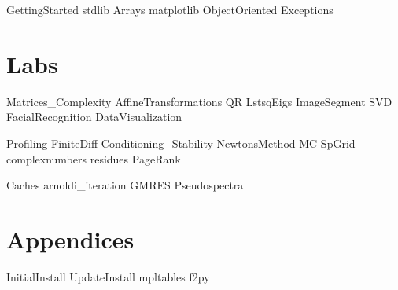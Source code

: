 \documentclass[nociteref]{SIAM-GH-book}
\begin{document}
{GettingStarted}
{stdlib}
{Arrays}
{matplotlib}
{ObjectOriented}
{Exceptions}

\part{Labs}
{Matrices_Complexity}
{AffineTransformations}
{QR}
{LstsqEigs}
{ImageSegment}
{SVD}
{FacialRecognition}
{DataVisualization}


{Profiling}
{FiniteDiff}
{Conditioning_Stability}
{NewtonsMethod}
{MC}
{SpGrid}
{complexnumbers}
{residues}
{PageRank}



{Caches}
{arnoldi_iteration}
{GMRES}
{Pseudospectra}


\part{Appendices}
\begin{appendices}
{InitialInstall}
{UpdateInstall}
{mpltables}
{f2py}
\end{appendices}
\end{document}
